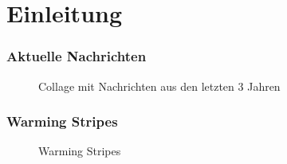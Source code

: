 \section{Einleitung}

\begin{frame}
	\frametitle{Aktuelle Nachrichten}
	\begin{figure}
		\caption{Collage mit Nachrichten aus den letzten 3 Jahren}
	\end{figure}
\end{frame}



\begin{frame}
	\frametitle{Warming Stripes}
	
	
	\begin{figure}
		\caption{Warming Stripes}
	\end{figure}
	
\end{frame}